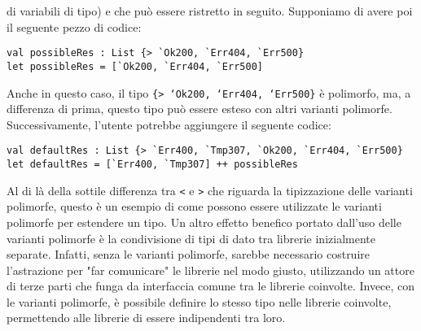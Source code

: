 \documentclass[10pt,a4paper]{article}
\begin{document}
di variabili di tipo) e che può essere ristretto in seguito. Supponiamo di avere poi il seguente pezzo di codice:
\begin{lstlisting}
val possibleRes : List {> `Ok200, `Err404, `Err500}
let possibleRes = [`Ok200, `Err404, `Err500]
\end{lstlisting}
Anche in questo caso, il tipo \texttt{\{> `Ok200, `Err404, `Err500\}} è polimorfo, ma, a differenza di prima, questo
tipo può essere esteso con altri varianti polimorfe. Successivamente, l'utente potrebbe aggiungere il seguente codice:
\begin{lstlisting}
val defaultRes : List {> `Err400, `Tmp307, `Ok200, `Err404, `Err500}
let defaultRes = [`Err400, `Tmp307] ++ possibleRes
\end{lstlisting}
Al di là della sottile differenza tra \texttt{<} e \texttt{>} che riguarda la tipizzazione delle varianti polimorfe,
questo è un esempio di come possono essere utilizzate le varianti polimorfe per estendere un tipo. Un altro effetto
benefico portato dall'uso delle varianti polimorfe è la condivisione di tipi di dato tra librerie inizialmente separate.
Infatti, senza le varianti polimorfe, sarebbe necessario costruire l'astrazione per "far comunicare" le
librerie nel modo giusto, utilizzando un attore di terze parti che funga da interfaccia comune tra le librerie coinvolte.
Invece, con le varianti polimorfe, è possibile definire lo stesso tipo nelle librerie coinvolte, permettendo
alle librerie di essere indipendenti tra loro.
\end{document}
